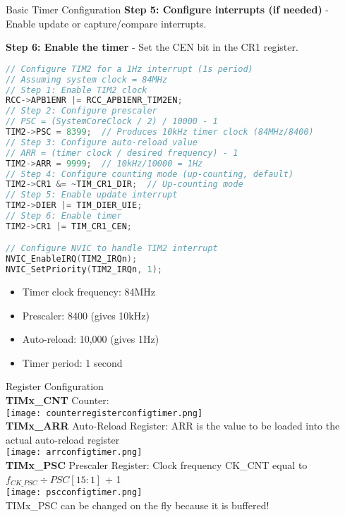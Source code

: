 \begin{example2}{Basic Timer Configuration}
\textbf{Step 5: Configure interrupts (if needed)} -
Enable update or capture/compare interrupts.

\textbf{Step 6: Enable the timer} -
Set the CEN bit in the CR1 register.

\begin{lstlisting}[language=C, style=basesmol]
// Configure TIM2 for a 1Hz interrupt (1s period)
// Assuming system clock = 84MHz
// Step 1: Enable TIM2 clock
RCC->APB1ENR |= RCC_APB1ENR_TIM2EN;
// Step 2: Configure prescaler
// PSC = (SystemCoreClock / 2) / 10000 - 1
TIM2->PSC = 8399;  // Produces 10kHz timer clock (84MHz/8400)
// Step 3: Configure auto-reload value
// ARR = (timer clock / desired frequency) - 1
TIM2->ARR = 9999;  // 10kHz/10000 = 1Hz
// Step 4: Configure counting mode (up-counting, default)
TIM2->CR1 &= ~TIM_CR1_DIR;  // Up-counting mode
// Step 5: Enable update interrupt
TIM2->DIER |= TIM_DIER_UIE;
// Step 6: Enable timer
TIM2->CR1 |= TIM_CR1_CEN;

// Configure NVIC to handle TIM2 interrupt
NVIC_EnableIRQ(TIM2_IRQn);
NVIC_SetPriority(TIM2_IRQn, 1);
\end{lstlisting}

\begin{itemize}
    \item Timer clock frequency: 84MHz
    \item Prescaler: 8400 (gives 10kHz)
    \item Auto-reload: 10,000 (gives 1Hz)
    \item Timer period: 1 second
\end{itemize}
\end{example2}


\begin{theorem}{Register Configuration}\\
    \textbf{TIMx\_CNT} Counter:\\
    \texttt{[image: counterregisterconfigtimer.png]}
    \vspace{1mm}\\
    \textbf{TIMx\_ARR} Auto-Reload Register: ARR is the value to be loaded into the actual auto-reload register\\
    \texttt{[image: arrconfigtimer.png]}
    \vspace{1mm}\\
    \textbf{TIMx\_PSC} Prescaler Register: Clock frequency CK\_CNT equal to $f_{CK\_PSC} \div PSC[15:1]$ + 1\\
    \texttt{[image: pscconfigtimer.png]}\\
    TIMx\_PSC can be changed on the fly because it is buffered!
\end{theorem}

